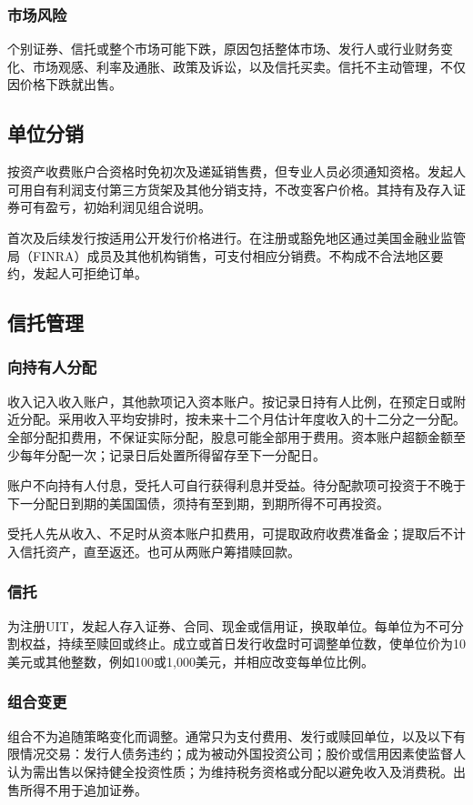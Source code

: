 \documentclass[UTF8,fontset=none,11pt,a4paper]{ctexart}
\begin{document}
\subsubsection*{市场风险}
个别证券、信托或整个市场可能下跌，原因包括整体市场、发行人或行业财务变化、市场观感、利率及通胀、政策及诉讼，以及信托买卖。信托不主动管理，不仅因价格下\allowbreak\mbox{跌就出售。}


\subsection*{单位分销}
按资产收费账户合资格时免初次及递延销售费，但专业人员必须通知资格。发起人可用自有利润支付第三方货架及其他分销支持，不改变客户价格。其持有及存入证券可有盈亏，初始利润见\allowbreak\mbox{组合说明。}


首次及后续发行按适用公开发行价格进行。在注册或豁免地区通过美国金融业监管局（FINRA）成员及其他机构销售，可支付相应分销费。不构成不合法地区要约，发起人可拒\allowbreak\mbox{绝订单。}


\subsection*{信托管理}
\subsubsection*{向持有人分配}
收入记入收入账户，其他款项记入资本账户。按记录日持有人比例，在预定日或附近分配。采用收入平均安排时，按未来十二个月估计年度收入的十二分之一分配。全部分配扣费用，不保证实际分配，股息可能全部用于费用。资本账户超额金额至少每年分配一次；记录日后处置所得留存至下\allowbreak\mbox{一分配日。}


账户不向持有人付息，受托人可自行获得利息并受益。待分配款项可投资于不晚于下一分配日到期的美国国债，须持有至到期，到期所得不\allowbreak\mbox{可再投资。}


受托人先从收入、不足时从资本账户扣费用，可提取政府收费准备金；提取后不计入信托资产，直至返还。也可从两账户筹\allowbreak\mbox{措赎回款。}


\subsubsection*{信托}
为注册UIT，发起人存入证券、合同、现金或信用证，换取单位。每单位为不可分割权益，持续至赎回或终止。成立或首日发行收盘时可调整单位数，使单位价为10美元或其他整数，例如100或1,000美元，并相应改变每\allowbreak\mbox{单位比例。}


\subsubsection*{组合变更}
组合不为追随策略变化而调整。通常只为支付费用、发行或赎回单位，以及以下有限情况交易：发行人债务违约；成为被动外国投资公司；股价或信用因素使监督人认为需出售以保持健全投资性质；为维持税务资格或分配以避免收入及消费税。出售所得不用于\allowbreak\mbox{追加证券。}
\end{document}
